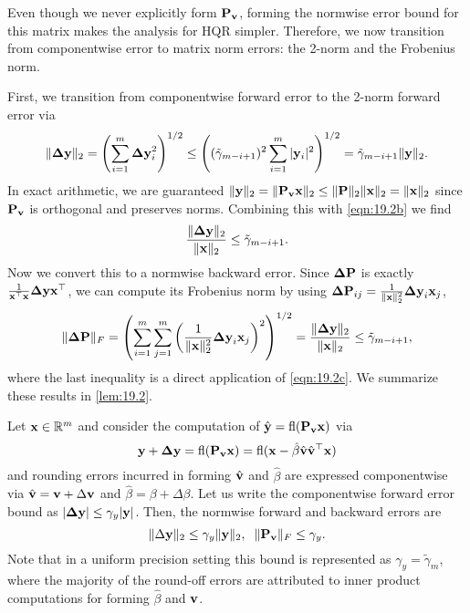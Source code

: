 Even though we never explicitly form $\mathbf{P_v}$, forming the normwise error bound for this matrix makes the analysis for HQR simpler.
Therefore, we now transition from componentwise error to matrix norm errors: the 2-norm and the Frobenius norm. 

First, we transition from componentwise forward error to the 2-norm forward error via 
\begin{equation}
\label{eqn:19.2b}
\|\bb{\Delta y}\|_2 = \left(\sum_{i=1}^m \bb{\Delta y}_i^2\right)^{1/2} \leq \left((\tilde{\gamma}_{m-i+1})^2\sum_{i=1}^m |\bb{y}_i|^2\right)^{1/2} =  \tilde{\gamma}_{m-i+1}\|\bb{y}\|_2. 
\end{equation}
In exact arithmetic, we are guaranteed $\|\mathbf{y}\|_2 = \|\mathbf{P_v x}\|_2 \leq \|\mathbf{P}\|_2 \|\mathbf{x}\|_2 = \|\mathbf{x}\|_2$
since $\mathbf{P_v}$ is orthogonal and preserves norms.
Combining this with \cref{eqn:19.2b} we find 
\begin{equation}
\frac{\|\bb{\Delta y}\|_2}{\|\bb{x}\|_2} \leq \tilde{\gamma}_{m-i+1}. \label{eqn:19.2c}
\end{equation}
Now we convert this to a normwise backward error.
Since $\mathbf{\Delta P}$ is exactly $\frac{1}{\mathbf{x}^{\top}\mathbf{x}}\mathbf{\Delta y}\mathbf{x}^{\top}$, we can compute its Frobenius norm by using $\mathbf{\Delta P}_{ij} = \frac{1}{\|\mathbf{x}\|_2^2}\mathbf{\Delta y}_i\mathbf{x}_j$,
	\begin{equation*}
	\|\mathbf{\Delta P}\|_F
	= \left(\sum_{i=1}^m\sum_{j=1}^m\left(\frac{1}{\|\mathbf{x}\|_2^2}\mathbf{\Delta y}_i\mathbf{x}_j\right)^2\right)^{1/2}
	=  \frac{\|\mathbf{\Delta y}\|_2}{\|\mathbf{x}\|_2} \leq \tilde{\gamma}_{m-i+1},
	\end{equation*}
where the last inequality is a direct application of \cref{eqn:19.2c}.
We summarize these results in \cref{lem:19.2}.
\begin{lemma}
	\label{lem:19.2}
	Let $\mathbf{x}\in\mathbb{R}^m$ and consider the computation of $\hat{\mathbf{y}}=\mathrm{fl}(\mathbf{P_vx})$ via 
	\begin{equation*}
		\mathbf{y}+\mathbf{\Delta y} = \mathrm{fl}(\mathbf{P_v}\mathbf{x}) = \mathrm{fl}(\mathbf{x}-\hat{\beta}\hat{\mathbf{v}}\hat{\mathbf{v}}^{\top}\mathbf{x})
	\end{equation*}
	and rounding errors incurred in forming $\hat{\mathbf{v}}$ and $\hat{\beta}$ are expressed componentwise via $\hat{\mathbf{v}} = \mathbf{v}+\Delta \mathbf{v}$ and $\hat{\beta} = \beta + \Delta \beta.$
	Let us write the componentwise forward error bound as $|\mathbf{\Delta y}|\leq \gamma_y|\mathbf{y}|$.
	Then, the normwise forward and backward errors are 
	\begin{equation*}
		\|\Delta \mathbf{y}\|_2 \leq \gamma_y\|\mathbf{y}\|_2,\;\; \|\mathbf{P_v}\|_F \leq \gamma_y.
	\end{equation*}
	Note that in a uniform precision setting this bound is represented as $\gamma_y = \tilde{\gamma}_{m}$, where the majority of the round-off errors are attributed to inner product computations for forming $\hat{\beta}$ and $\mathbf{v}$.
\end{lemma}
